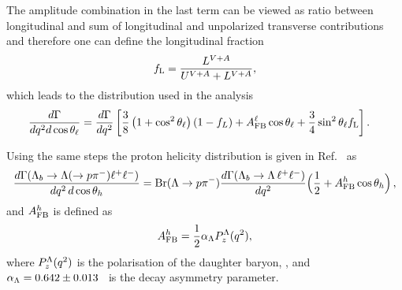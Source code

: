 The amplitude combination in the last term can be viewed as ratio between longitudinal and sum of
longitudinal and unpolarized transverse contributions and therefore one can define the longitudinal fraction
\begin{equation}
f_{\rm L}=\frac{L^{V+A}}{U^{V+A}+L^{V+A}},
\end{equation}
which leads to the distribution used in the analysis
\begin{align}
\frac{d\Gamma}{dq^2d\cos\theta_\ell}=
\frac{d\Gamma}{dq^2}&\left[  \frac{3}{8}\left(1+\cos^2\theta_\ell\right)(1-f_L)+A_{\rm FB}^\ell\cos\theta_\ell +
   \frac{3}{4}\sin^2\theta_\ell f_{\rm L}\right]. 
   \label{eq:afbLTh}
\end{align}

Using the same steps the proton helicity distribution is given in Ref.~\cite{Gutsche:2013pp} as
\begin{equation}
\frac{d\Gamma(\Lambda_{b}\to \Lambda(\to p \pi^{-})\ell^{+}\ell^{-})}
     {dq^2\,d\cos\theta_h} 
={\rm Br}(\Lambda \to p\pi^{-})
 \frac{d\Gamma(\Lambda_b \to \Lambda\, \ell^{+}\ell^{-})}{d q^2}
\Big(\frac{1}{2}+A_{\rm FB}^h\cos\theta_h\Big) \,,
\label{eq:afbBTh}
\end{equation}
and $A_{\rm FB}^h$ is defined as
\begin{equation}
A_{\rm FB}^h=\frac{1}{2}\alpha_{\Lambda}P_z^\Lambda(q^2),
\end{equation} 
where $P_z^\Lambda(q^2)$ is the polarisation of the daughter baryon, \Lz,
and $\alpha_{\Lambda} = 0.642 \pm 0.013$~\cite{PDG2014} is the \Lz decay asymmetry parameter.




